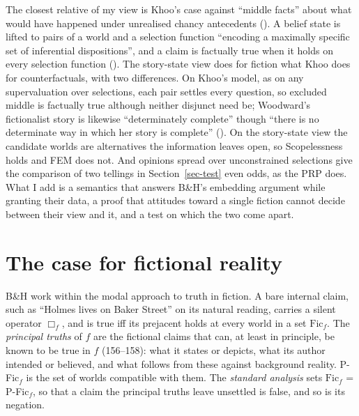 \documentclass[
  11pt,
  letterpaper,
  DIV=11,
  numbers=noendperiod,
  twoside]{scrartcl}
\begin{document}
The closest relative of my view is Khoo's case against ``middle facts''
about what would have happened under unrealised chancy antecedents
(). A belief state is lifted to
pairs of a world and a selection function ``encoding a maximally
specific set of inferential dispositions'', and a claim is factually
true when it holds on every selection function
(). The story-state view
does for fiction what Khoo does for counterfactuals, with two
differences. On Khoo's model, as on any supervaluation over selections,
each pair settles every question, so excluded middle is factually true
although neither disjunct need be; Woodward's fictionalist story is
likewise ``determinately complete'' though ``there is no determinate way
in which her story is complete'' (). On the story-state view the candidate worlds are
alternatives the information leaves open, so Scopelessness holds and FEM
does not. And opinions spread over unconstrained selections give the
comparison of two tellings in Section~\ref{sec-test} even odds, as the
PRP does. What I add is a semantics that answers B\&H's embedding
argument while granting their data, a proof that attitudes toward a
single fiction cannot decide between their view and it, and a test on
which the two come apart.

\section{The case for fictional reality}\label{sec-bh}

B\&H work within the modal approach to truth in fiction. A bare internal
claim, such as ``Holmes lives on Baker Street'' on its natural reading,
carries a silent operator \(\Box_f\), and is true iff its prejacent
holds at every world in a set \(\mathrm{Fic}_f\). The \emph{principal
truths} of \(f\) are the fictional claims that can, at least in
principle, be known to be true in \(f\) (156--158): what it states or
depicts, what its author intended or believed, and what follows from
these against background reality. P-Fic\(_f\) is the set of worlds
compatible with them. The \emph{standard analysis} sets
\(\mathrm{Fic}_f\) = P-Fic\(_f\), so that a claim the principal truths
leave unsettled is false, and so is its negation.
\end{document}
